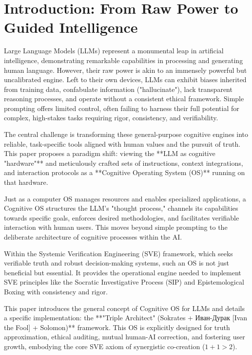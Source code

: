 \documentclass[11pt,a4paper]{article}
\theoremstyle{definition}
\theoremstyle{remark}
\begin{document}
\clearpage

\tableofcontents
\clearpage
\setcounter{page}{1}

\section{Introduction: From Raw Power to Guided Intelligence}

Large Language Models (LLMs) represent a monumental leap in artificial intelligence, demonstrating remarkable capabilities in processing and generating human language. However, their raw power is akin to an immensely powerful but uncalibrated engine. Left to their own devices, LLMs can exhibit biases inherited from training data, confabulate information ("hallucinate"), lack transparent reasoning processes, and operate without a consistent ethical framework. Simple prompting offers limited control, often failing to harness their full potential for complex, high-stakes tasks requiring rigor, consistency, and verifiability.

The central challenge is transforming these general-purpose cognitive engines into reliable, task-specific tools aligned with human values and the pursuit of truth. This paper proposes a paradigm shift: viewing the **LLM as cognitive "hardware"** and meticulously crafted sets of instructions, context integrations, and interaction protocols as a **Cognitive Operating System (OS)** running on that hardware.

Just as a computer OS manages resources and enables specialized applications, a Cognitive OS structures the LLM's "thought process," channels its capabilities towards specific goals, enforces desired methodologies, and facilitates verifiable interaction with human users. This moves beyond simple prompting to the deliberate architecture of cognitive processes within the AI.

Within the Systemic Verification Engineering (SVE) framework, which seeks verifiable truth and robust decision-making systems, such an OS is not just beneficial but essential. It provides the operational engine needed to implement SVE principles like the Socratic Investigative Process (SIP) \cite[S.V.E. 0(2)]{} and Epistemological Boxing \cite[S.V.E. 0(1)]{} with consistency and rigor.

This paper introduces the general concept of Cognitive OS for LLMs and details a specific implementation: the **"Triple Architect" (Sokrates + Иван-Дурак [Ivan the Fool] + Solomon)** framework. This OS is explicitly designed for truth approximation, ethical auditing, mutual human-AI correction, and fostering user growth, embodying the core SVE axiom of synergistic co-creation ($1+1>2$).
\end{document}
